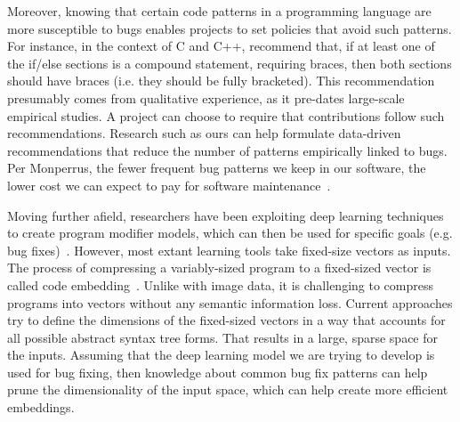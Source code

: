 Moreover, knowing that certain code patterns in a programming language are more susceptible to bugs enables projects to set policies that avoid such patterns. For instance, in the context of C and C++, \cite{Cannon1997RecommendedCS} recommend that, if at least one of the if/else sections is a compound statement, requiring braces, then both sections should have braces (i.e. they should be fully bracketed). This recommendation presumably comes from qualitative experience, as it pre-dates large-scale empirical studies. A project can choose to require that contributions follow such recommendations. Research such as ours can help formulate data-driven recommendations that reduce the number of patterns empirically linked to bugs. Per Monperrus, the fewer frequent bug patterns we keep in our software, the lower cost we can expect to pay for software maintenance~\citep{monperrus2014critical}.

Moving further afield, researchers have been exploiting deep learning techniques to create program modifier models, which can then be used for specific goals (e.g. bug fixes)~\citep{alon2019code2vec,alon2018general,raychev2016learning,bielik2016phog}. However, most extant learning tools take fixed-size vectors as inputs. The process of compressing a variably-sized program to a fixed-sized vector is called code embedding~\citep{chen2019literature}. Unlike with image data, it is challenging to compress programs into vectors without any semantic information loss. Current approaches try to define the dimensions of the fixed-sized vectors in a way that accounts for all possible abstract syntax tree forms. That results in a large, sparse space for the inputs. Assuming that the deep learning model we are trying to develop is used for bug fixing, then knowledge about common bug fix patterns can help prune the dimensionality of the input space, which can help create more efficient embeddings.

